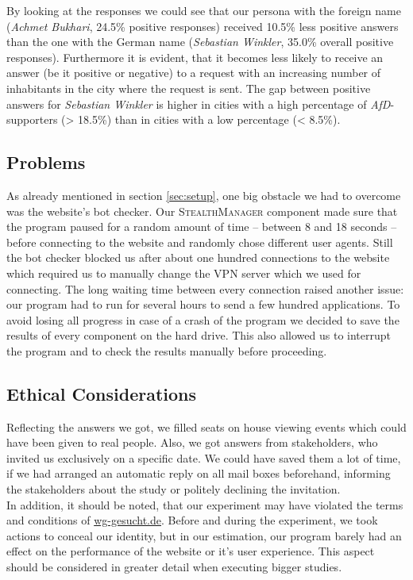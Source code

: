 \documentclass[11pt]{scrartcl}
\begin{document}
By looking at the responses we could see that our persona with the foreign name (\textit{Achmet Bukhari}, 24.5\% positive responses) received 10.5\% less positive answers than the one with the German name (\textit{Sebastian Winkler}, 35.0\% overall positive responses). Furthermore it is evident, that it becomes less likely to receive an answer (be it positive or negative) to a request with an increasing number of inhabitants in the city where the request is sent. The gap between positive answers for \textit{Sebastian Winkler} is higher in cities with a high percentage of \textit{AfD}-supporters (> 18.5\%) than in cities with a low percentage (< 8.5\%).
\subsection{Problems}
As already mentioned in section \ref{sec:setup}, one big obstacle we had to overcome was the website's bot checker. Our \textsc{StealthManager} component made sure that the program paused for a random amount of time -- between 8 and 18 seconds -- before connecting to the website and randomly chose different user agents. Still the bot checker blocked us after about one hundred connections to the website which required us to manually change the VPN server which we used for connecting. \newline
The long waiting time between every connection raised another issue: our program had to run for several hours to send a few hundred applications. To avoid losing all progress in case of a crash of the program we decided to save the results of every component on the hard drive. This also allowed us to interrupt the program and to check the results manually before proceeding.

\subsection{Ethical Considerations}
Reflecting the answers we got, we filled seats on house viewing events which could have been given to real people. Also, we got answers from stakeholders, who invited us exclusively on a specific date. We could have saved them a lot of time, if we had arranged an automatic reply on all mail boxes beforehand, informing the stakeholders about the study or politely declining the invitation.\\
In addition, it should be noted, that our experiment may have violated the terms and conditions of \url{wg-gesucht.de}. Before and during the experiment, we took actions to conceal our identity, but in our estimation, our program barely had an effect on the performance of the website or it's user experience. This aspect should be considered in greater detail when executing bigger studies.



\end{document}

